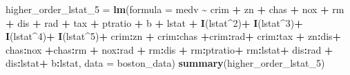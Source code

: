 \documentclass[
]{article}
\newenvironment{Shaded}{\begin{snugshade}}{\end{snugshade}}
\newcommand{\AttributeTok}[1]{\textcolor[rgb]{0.13,0.29,0.53}{#1}}
\newcommand{\DecValTok}[1]{\textcolor[rgb]{0.00,0.00,0.81}{#1}}
\newcommand{\FunctionTok}[1]{\textcolor[rgb]{0.13,0.29,0.53}{\textbf{#1}}}
\newcommand{\NormalTok}[1]{#1}
\newcommand{\OtherTok}[1]{\textcolor[rgb]{0.56,0.35,0.01}{#1}}
\newcommand{\SpecialCharTok}[1]{\textcolor[rgb]{0.81,0.36,0.00}{\textbf{#1}}}
\begin{document}
\begin{Shaded}
\begin{Highlighting}[]
\NormalTok{higher\_order\_lstat\_5 }\OtherTok{=} \FunctionTok{lm}\NormalTok{(}\AttributeTok{formula =}\NormalTok{ medv }\SpecialCharTok{\textasciitilde{}}\NormalTok{ crim }\SpecialCharTok{+}\NormalTok{ zn }\SpecialCharTok{+}\NormalTok{ chas }\SpecialCharTok{+}\NormalTok{ nox }\SpecialCharTok{+}\NormalTok{ rm }\SpecialCharTok{+}\NormalTok{ dis }\SpecialCharTok{+}\NormalTok{ rad }\SpecialCharTok{+}\NormalTok{ tax }\SpecialCharTok{+}\NormalTok{ ptratio }\SpecialCharTok{+}\NormalTok{ b }\SpecialCharTok{+}\NormalTok{ lstat }\SpecialCharTok{+} \FunctionTok{I}\NormalTok{(lstat}\SpecialCharTok{\^{}}\DecValTok{2}\NormalTok{)}\SpecialCharTok{+} \FunctionTok{I}\NormalTok{(lstat}\SpecialCharTok{\^{}}\DecValTok{3}\NormalTok{)}\SpecialCharTok{+} \FunctionTok{I}\NormalTok{(lstat}\SpecialCharTok{\^{}}\DecValTok{4}\NormalTok{)}\SpecialCharTok{+} \FunctionTok{I}\NormalTok{(lstat}\SpecialCharTok{\^{}}\DecValTok{5}\NormalTok{)}\SpecialCharTok{+}\NormalTok{ crim}\SpecialCharTok{:}\NormalTok{zn }\SpecialCharTok{+}\NormalTok{ crim}\SpecialCharTok{:}\NormalTok{chas  }\SpecialCharTok{+}\NormalTok{crim}\SpecialCharTok{:}\NormalTok{rad}\SpecialCharTok{+}\NormalTok{ crim}\SpecialCharTok{:}\NormalTok{tax }\SpecialCharTok{+}\NormalTok{ zn}\SpecialCharTok{:}\NormalTok{dis}\SpecialCharTok{+}\NormalTok{ chas}\SpecialCharTok{:}\NormalTok{nox }\SpecialCharTok{+}\NormalTok{chas}\SpecialCharTok{:}\NormalTok{rm }\SpecialCharTok{+}\NormalTok{ nox}\SpecialCharTok{:}\NormalTok{rad }\SpecialCharTok{+}\NormalTok{ rm}\SpecialCharTok{:}\NormalTok{dis }\SpecialCharTok{+}\NormalTok{ rm}\SpecialCharTok{:}\NormalTok{ptratio}\SpecialCharTok{+}\NormalTok{ rm}\SpecialCharTok{:}\NormalTok{lstat}\SpecialCharTok{+}\NormalTok{ dis}\SpecialCharTok{:}\NormalTok{rad }\SpecialCharTok{+}\NormalTok{ dis}\SpecialCharTok{:}\NormalTok{lstat}\SpecialCharTok{+}\NormalTok{ b}\SpecialCharTok{:}\NormalTok{lstat, }\AttributeTok{data =}\NormalTok{ boston\_data)}
\FunctionTok{summary}\NormalTok{(higher\_order\_lstat\_5)}
\end{Highlighting}
\end{Shaded}
\end{document}
